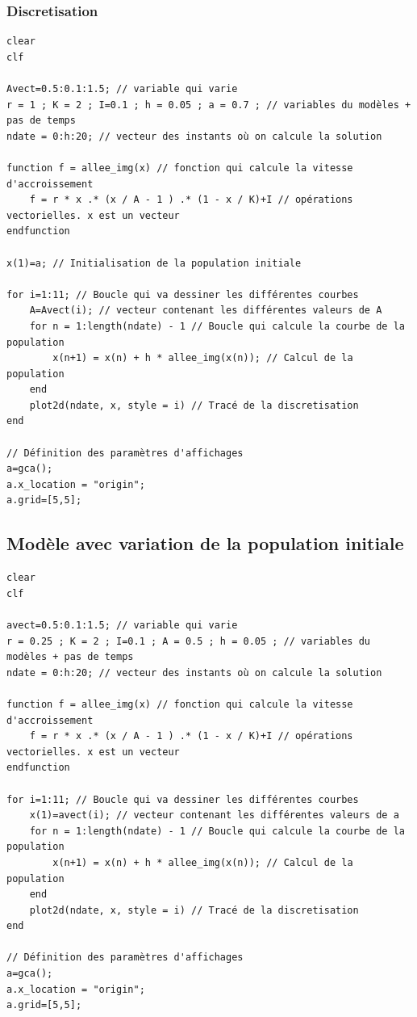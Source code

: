 \documentclass{article}
\begin{document}
\subsubsection{Discretisation}

\begin{verbatim}
clear
clf

Avect=0.5:0.1:1.5; // variable qui varie
r = 1 ; K = 2 ; I=0.1 ; h = 0.05 ; a = 0.7 ; // variables du modèles + pas de temps
ndate = 0:h:20; // vecteur des instants où on calcule la solution

function f = allee_img(x) // fonction qui calcule la vitesse d'accroissement
    f = r * x .* (x / A - 1 ) .* (1 - x / K)+I // opérations vectorielles. x est un vecteur
endfunction

x(1)=a; // Initialisation de la population initiale

for i=1:11; // Boucle qui va dessiner les différentes courbes
    A=Avect(i); // vecteur contenant les différentes valeurs de A
    for n = 1:length(ndate) - 1 // Boucle qui calcule la courbe de la population
        x(n+1) = x(n) + h * allee_img(x(n)); // Calcul de la population
    end 
    plot2d(ndate, x, style = i) // Tracé de la discretisation
end

// Définition des paramètres d'affichages
a=gca();
a.x_location = "origin";
a.grid=[5,5];
\end{verbatim}

\subsection{Modèle avec variation de la population initiale}

\begin{verbatim}
clear
clf

avect=0.5:0.1:1.5; // variable qui varie
r = 0.25 ; K = 2 ; I=0.1 ; A = 0.5 ; h = 0.05 ; // variables du modèles + pas de temps
ndate = 0:h:20; // vecteur des instants où on calcule la solution

function f = allee_img(x) // fonction qui calcule la vitesse d'accroissement
    f = r * x .* (x / A - 1 ) .* (1 - x / K)+I // opérations vectorielles. x est un vecteur
endfunction

for i=1:11; // Boucle qui va dessiner les différentes courbes
    x(1)=avect(i); // vecteur contenant les différentes valeurs de a
    for n = 1:length(ndate) - 1 // Boucle qui calcule la courbe de la population
        x(n+1) = x(n) + h * allee_img(x(n)); // Calcul de la population
    end 
    plot2d(ndate, x, style = i) // Tracé de la discretisation
end

// Définition des paramètres d'affichages
a=gca();
a.x_location = "origin";
a.grid=[5,5];
\end{verbatim}
\end{document}
